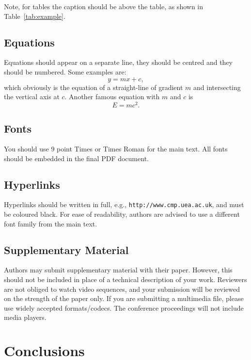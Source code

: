 \documentclass{cmppgr}
\begin{document}
Note, for tables the caption should be above the table, as shown in Table~\ref{tab:example}.

\subsection{Equations}

Equations should appear on a separate line, they should be centred and they should be numbered. Some examples are:
%
\begin{equation}
y = mx + c,
\label{eqn:line}
\end{equation}
%
which obviously is the equation of a straight-line of gradient $m$ and intersecting the vertical axis at $c$. Another famous equation with $m$ and $c$ is
%
\begin{equation}
E = mc^2.
\label{eqn:einstein}
\end{equation}

\subsection{Fonts}

You should use 9 point Times or Times Roman for the main text. All fonts should be embedded in the final PDF document.

\subsection{Hyperlinks}

Hyperlinks should be written in full, e.g., \texttt{http://www.cmp.uea.ac.uk}, and must be coloured black. For ease of readability, authors are advised to use a different font family from the main text.

\subsection{Supplementary Material}

Authors may submit supplementary material with their paper. However, this should not be included in place of a technical description of your work. Reviewers are not obliged to watch video sequences, and your submission will be reviewed on the strength of the paper only. If you are submitting a multimedia file, please use widely accepted formats/codecs. The conference proceedings will not include media players.

\section{Conclusions}
\end{document}
